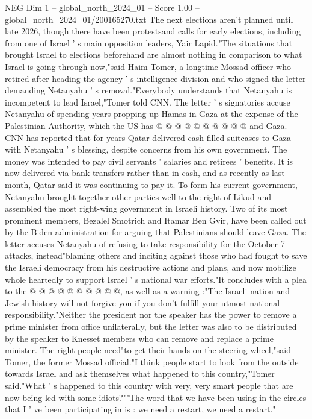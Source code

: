 \begin{textsample}{NEG Dim 1 – global\_north\_2024\_01 – Score 1.00 – global\_north\_2024\_01/200165270.txt}
The next elections aren't planned until late 2026, though there have been protestsand calls for early elections, including from one of Israel ' s main opposition leaders, Yair Lapid."The situations that brought Israel to elections beforehand are almost nothing in comparison to what Israel is going through now,"said Haim Tomer, a longtime Mossad officer who retired after heading the agency ' s intelligence division and who signed the letter demanding Netanyahu ' s removal."Everybody understands that Netanyahu is incompetent to lead Israel,"Tomer told CNN.
The letter ' s signatories accuse Netanyahu of spending years propping up Hamas in Gaza at the expense of the Palestinian Authority, which the US has @ @ @ @ @ @ @ @ @ @ and Gaza.
CNN has reported that for years Qatar delivered cash-filled suitcases to Gaza with Netanyahu ' s blessing, despite concerns from his own government.
The money was intended to pay civil servants ' salaries and retirees ' benefits.
It is now delivered via bank transfers rather than in cash, and as recently as last month, Qatar said it was continuing to pay it.
To form his current government, Netanyahu brought together other parties well to the right of Likud and assembled the most right-wing government in Israeli history.
Two of its most prominent members, Bezalel Smotrich and Itamar Ben Gvir, have been called out by the Biden administration for arguing that Palestinians should leave Gaza.
The letter accuses Netanyahu of refusing to take responsibility for the October 7 attacks, instead"blaming others and inciting against those who had fought to save the Israeli democracy from his destructive actions and plans, and now mobilize whole heartedly to support Israel ' s national war efforts."It concludes with a plea to the @ @ @ @ @ @ @ @ @ @, as well as a warning :"The Israeli nation and Jewish history will not forgive you if you don't fulfill your utmost national responsibility."Neither the president nor the speaker has the power to remove a prime minister from office unilaterally, but the letter was also to be distributed by the speaker to Knesset members who can remove and replace a prime minister.
The right people need"to get their hands on the steering wheel,"said Tomer, the former Mossad official."I think people start to look from the outside towards Israel and ask themselves what happened to this country,"Tomer said."What ' s happened to this country with very, very smart people that are now being led with some idiots?""The word that we have been using in the circles that I ' ve been participating in is : we need a restart, we need a restart."

\end{textsample}
